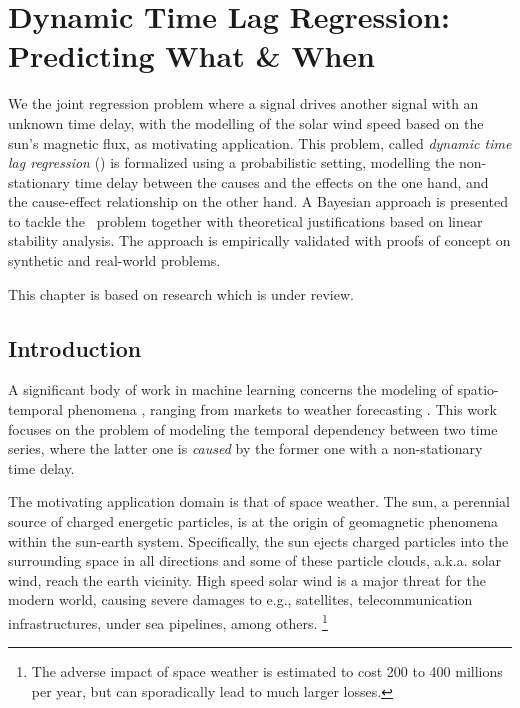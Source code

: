 \chapter{Dynamic Time Lag Regression: Predicting What \& When}\label{chapter:pdt}

{\small
  We the joint regression problem where a signal drives another signal with an unknown time delay, with the modelling 
  of the solar wind speed based on the sun's magnetic flux, as motivating application. This problem, called 
  \emph{dynamic time lag regression} (\XX) is formalized using a probabilistic setting, modelling the non-stationary 
  time delay between the causes and the effects on the one hand, and the cause-effect relationship on the other hand. 
  A Bayesian approach is presented to tackle the \XX\ problem together with theoretical justifications based on 
  linear stability analysis. The approach is empirically validated with proofs of concept on synthetic and 
  real-world problems. 
}


\vfill
{}
\vfill

\noindent
    \parbox{\textwidth}{%
        {\small This chapter is based on research which is under review.}
    }%


\clearpage


\section{Introduction}\label{sec:intro}
A significant body of work in machine learning concerns the modeling of spatio-temporal phenomena 
\citep{SurveyST,NIPSForecasting18}, ranging from markets \citep{Pedreschi} to weather forecasting 
\citep{Horvitz}. This work focuses on the problem of modeling the temporal dependency between two time series, 
where the latter one is {\em caused} by the former one \citep{Granger} with a non-stationary time delay. 

The motivating application domain is that of space weather. The sun, a perennial source of charged energetic particles, 
is at the origin of geomagnetic phenomena within the sun-earth system. Specifically, the sun ejects 
charged particles into the surrounding space in all directions and some of these particle clouds, a.k.a. solar wind, 
reach the earth vicinity. High speed solar wind is a major threat for the modern world, causing severe damages to 
e.g., satellites, telecommunication infrastructures, under sea pipelines, among others.
\footnote{The adverse impact of space weather is estimated to cost 200 to 400 millions per year, 
but can sporadically lead to much larger losses.} 

